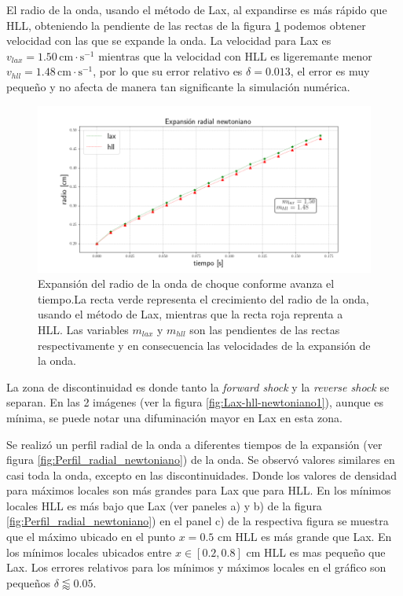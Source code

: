 \documentclass[12pt,a4paper]{book}
\begin{document}
El radio de la onda, usando el método de Lax, al expandirse es más rápido que HLL, obteniendo la pendiente de las rectas de la figura \ref{fig:expansion_radial_newtoniano} podemos obtener velocidad con las que se expande la onda. La velocidad para Lax es $v_{lax} = 1.50 \, \mathrm{cm} \cdot \mathrm{s}^{-1}$ mientras que la velocidad con HLL es ligeremante menor $v_{hll} = 1.48  \, \mathrm{cm} \cdot \mathrm{s}^{-1}$, por lo que su error relativo es $\delta  = 0.013$, el error es muy pequeño y no afecta de manera tan significante la simulación numérica.

\begin{figure}
\centering
\includegraphics[width=1.0\textwidth]{./Figuras/Pruebas/expansion_radial/expansion_radial_newtoniano}
\caption{\label{fig:expansion_radial_newtoniano}Expansión del radio de la onda de choque conforme avanza el tiempo.La recta verde representa el crecimiento del radio de la onda, usando el método de Lax, mientras que la recta roja reprenta a HLL. Las variables $m_{lax}$ y $m_{hll}$ son las pendientes de las rectas respectivamente y en consecuencia las velocidades de la expansión de la onda.} 
\end{figure}

La zona de discontinuidad es donde tanto la \emph{forward shock} y la \emph{reverse shock} se separan. En las 2 imágenes (ver la figura \ref{fig:Lax-hll-newtoniano1}), aunque es mínima, se puede notar una difuminación mayor en Lax en esta zona.

Se realizó un perfil radial de la onda a diferentes tiempos de la expansión (ver figura \ref{fig:Perfil_radial_newtoniano}) de la onda. Se observó valores similares en casi toda la onda, excepto en las discontinuidades. Donde los valores de densidad para máximos locales son más grandes para Lax que para HLL. En los mínimos locales HLL es más bajo que Lax (ver paneles a) y b) de la figura \ref{fig:Perfil_radial_newtoniano})
en el panel c) de la respectiva figura se muestra que el máximo ubicado en el punto $x  = 0.5$ cm HLL es más grande que Lax. En los mínimos locales ubicados entre $x \in [0.2, 0.8]$ cm  HLL es mas pequeño que Lax. Los errores relativos para los mínimos y máximos locales en el gráfico son pequeños $\delta \lessapprox 0.05$.
\end{document}
